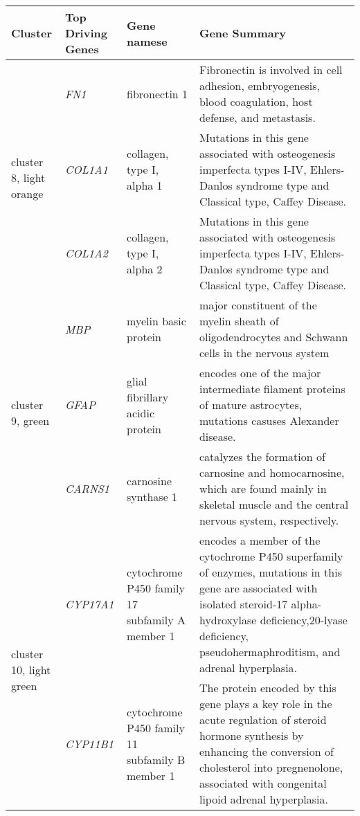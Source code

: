 \begin{tabular}{|p{0.6in}|p{0.6in}|p{1.3 in}|p{3.8in}|}
\hline
Cluster & Top Driving \qquad Genes & Gene namese  & Gene Summary \\
\hline
 \multirow{3}{4em}{\scriptsize{cluster 8, light orange} } & \small{\textit{FN1}}  & \scriptsize{fibronectin 1} & \scriptsize{Fibronectin is involved in cell adhesion, embryogenesis, blood coagulation, host defense, and metastasis.}   \\
 					 & \small{\textit{COL1A1}} & \scriptsize{collagen, type I, alpha 1} & \scriptsize{Mutations in this gene associated with osteogenesis imperfecta types I-IV, Ehlers-Danlos syndrome type and Classical type, Caffey Disease}. \\
					      & \small{\textit{COL1A2}} & \scriptsize{collagen, type I, alpha 2} & \scriptsize{Mutations in this gene associated with osteogenesis imperfecta types I-IV, Ehlers-Danlos syndrome type and Classical type, Caffey Disease}. \\
\hline
 \multirow{3}{4em}{\scriptsize{cluster 9, green} } & \small{\textit{MBP}} & \scriptsize{myelin basic protein} & \scriptsize{major constituent of the myelin sheath of oligodendrocytes and Schwann cells in the nervous system}    \\
 					 & \small{\textit{GFAP}} & \scriptsize{glial fibrillary acidic protein} & \scriptsize{encodes one of the major intermediate filament proteins of mature astrocytes, mutations casuses Alexander disease.} \\
					      & \small{\textit{CARNS1}} & \scriptsize{carnosine synthase 1} & \scriptsize{catalyzes the formation of carnosine and homocarnosine, which are found mainly in skeletal muscle and the central nervous system, respectively}. \\
\hline
 \multirow{3}{4em}{\scriptsize{cluster 10, light green} } & \small{\textit{CYP17A1}} & \scriptsize{cytochrome P450 family 17 subfamily A member 1} & \scriptsize{encodes a member of the cytochrome P450 superfamily of enzymes, mutations in this gene are associated with isolated steroid-17 alpha-hydroxylase deficiency,20-lyase deficiency, pseudohermaphroditism, and adrenal hyperplasia.}    \\
 					 & \small{\textit{CYP11B1}} & \scriptsize{cytochrome P450 family 11 subfamily B member 1} & \scriptsize{The protein encoded by this gene plays a key role in the acute regulation of steroid hormone synthesis by enhancing the conversion of cholesterol into pregnenolone, associated with congenital lipoid adrenal hyperplasia.} \\

\end{tabular}
